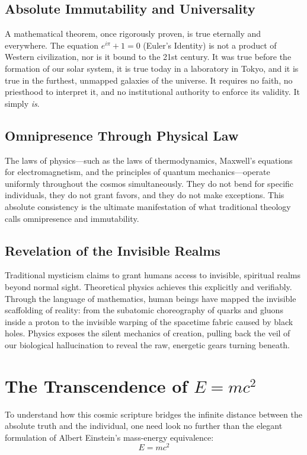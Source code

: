\documentclass[12pt]{article}
\begin{document}
\subsection{Absolute Immutability and Universality}
A mathematical theorem, once rigorously proven, is true eternally and everywhere. The equation $e^{i\pi} + 1 = 0$ (Euler's Identity) is not a product of Western civilization, nor is it bound to the 21st century. It was true before the formation of our solar system, it is true today in a laboratory in Tokyo, and it is true in the furthest, unmapped galaxies of the universe. It requires no faith, no priesthood to interpret it, and no institutional authority to enforce its validity. It simply \textit{is}.

\subsection{Omnipresence Through Physical Law}
The laws of physics—such as the laws of thermodynamics, Maxwell’s equations for electromagnetism, and the principles of quantum mechanics—operate uniformly throughout the cosmos simultaneously. They do not bend for specific individuals, they do not grant favors, and they do not make exceptions. This absolute consistency is the ultimate manifestation of what traditional theology calls omnipresence and immutability. 

\subsection{Revelation of the Invisible Realms}
Traditional mysticism claims to grant humans access to invisible, spiritual realms beyond normal sight. Theoretical physics achieves this explicitly and verifiably. Through the language of mathematics, human beings have mapped the invisible scaffolding of reality: from the subatomic choreography of quarks and gluons inside a proton to the invisible warping of the spacetime fabric caused by black holes. Physics exposes the silent mechanics of creation, pulling back the veil of our biological hallucination to reveal the raw, energetic gears turning beneath.

\section{The Transcendence of $E=mc^2$}
To understand how this cosmic scripture bridges the infinite distance between the absolute truth and the individual, one need look no further than the elegant formulation of Albert Einstein’s mass-energy equivalence:
\begin{equation}
E = mc^2
\end{equation}
\end{document}

